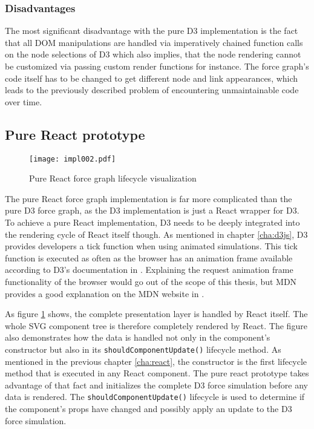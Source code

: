 \subsubsection{Disadvantages}

The most significant disadvantage with the pure D3 implementation is the fact that all DOM manipulations are handled via imperatively chained function calls on the node selections of D3 which also implies, that the node rendering cannot be customized via passing custom render functions for instance. The force graph's code itself has to be changed to get different node and link appearances, which leads to the previously described problem of encountering unmaintainable code over time.


\subsection{Pure React prototype}

\begin{figure}
\centering
\texttt{[image: impl002.pdf]}
\caption{Pure React force graph lifecycle visualization}
\label{fig:pureReactLifecycle}
\end{figure}

The pure React force graph implementation is far more complicated than the pure D3 force graph, as the D3 implementation is just a React wrapper for D3. To achieve a pure React implementation, D3 needs to be deeply integrated into the rendering cycle of React itself though. As mentioned in chapter \ref{cha:d3js}, D3 provides developers a tick function when using animated simulations. This tick function is executed as often as the browser has an animation frame available according to D3's documentation in \cite[/d3-timer/blob/master/README.md]{D3Github}. Explaining the request animation frame functionality of the browser would go out of the scope of this thesis, but MDN provides a good explanation on the MDN website in \cite{RAF}.

As figure \ref{fig:pureReactLifecycle} shows, the complete presentation layer is handled by React itself. The whole SVG component tree is therefore completely rendered by React. The figure also demonstrates how the data is handled not only in the component's constructor but also in its \texttt{shouldComponentUpdate()} lifecycle method. As mentioned in the previous chapter \ref{cha:react}, the constructor is the first lifecycle method that is executed in any React component. The pure react prototype takes advantage of that fact and initializes the complete D3 force simulation before any data is rendered. The \texttt{shouldComponentUpdate()} lifecycle is used to determine if the component's props have changed and possibly apply an update to the D3 force simulation.

